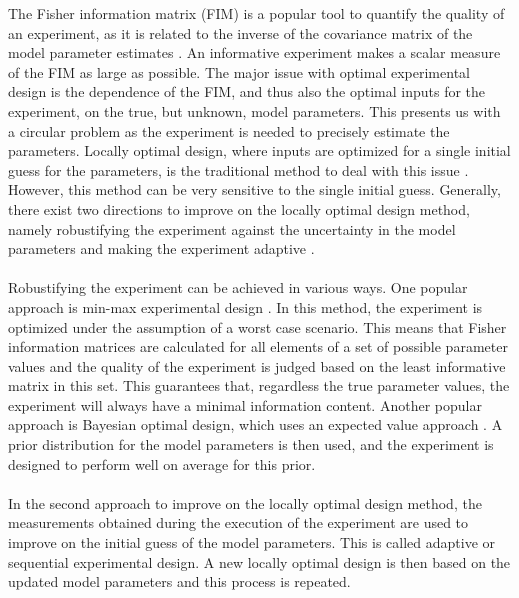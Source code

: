 The Fisher information matrix (FIM) is a popular tool to quantify the quality of an experiment, as it is related to the inverse of the covariance matrix of the model parameter estimates \parencite{fedorov}. An informative experiment makes a scalar measure of the FIM as large as possible. The major issue with optimal experimental design is the dependence of the FIM, and thus also the optimal inputs for the experiment, on the true, but unknown, model parameters. This presents us with a circular problem as the experiment is needed to precisely estimate the parameters. Locally optimal design, where inputs are optimized for a single initial guess for the parameters, is the traditional method to deal with this issue \parencite{atkinson}. However, this method can be very sensitive to the single initial guess. Generally, there exist two directions to improve on the locally optimal design method, namely robustifying the experiment against the uncertainty in the model parameters and making the experiment adaptive \parencite{walter}.
\\
\\
Robustifying the experiment can be achieved in various ways. One popular approach is min-max experimental design \parencite{korkel}. In this method, the experiment is optimized under the assumption of a worst case scenario. This means that Fisher information matrices are calculated for all elements of a set of possible parameter values and the quality of the experiment is judged based on the least informative matrix in this set. This guarantees that, regardless the true parameter values, the experiment will always have a minimal information content. Another popular approach is Bayesian optimal design, which uses an expected value approach \parencite{chaloner}. A prior distribution for the model parameters is then used, and the experiment is designed to perform well on average for this prior.
\\
\\
In the second approach to improve on the locally optimal design method, the measurements obtained during the execution of the experiment are used to improve on the initial guess of the model parameters. This is called adaptive or sequential experimental design. A new locally optimal design is then based on the updated model parameters and this process is repeated.
\\
\\
